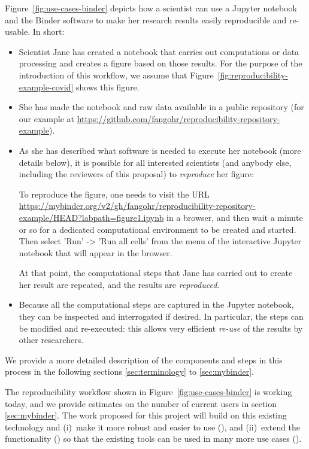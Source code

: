 Figure~\ref{fig:use-cases-binder} depicts how a scientist can use a Jupyter
notebook and the Binder software to make her research results easily
reproducible and re-usable. In short:
\begin{itemize}
\item Scientist Jane has created a notebook that carries out computations or
  data processing and creates a figure based on those results. For the purpose
  of the introduction of this workflow, we assume that
  Figure~\ref{fig:reproducibility-example-covid} shows this figure.

\item She has made the notebook and raw data available in a public repository
  (for our example at\newline
  \mbox{\url{https://github.com/fangohr/reproducibility-repository-example}}).

\item As she has described what software is needed to execute her notebook (more
  details below), it is possible for all interested scientists (and anybody
  else, including the reviewers of this proposal) to \emph{reproduce} her
  figure:

  To reproduce the figure, one needs to visit the URL\newline
  \mbox{\url{https://mybinder.org/v2/gh/fangohr/reproducibility-repository-example/HEAD?labpath=figure1.ipynb}}
  in a browser, and then wait a minute or so for a dedicated computational
  environment to be created and started. Then select 'Run' -> 'Run all cells'
  from the menu of the interactive Jupyter notebook that will appear in the
  browser.

  At that point, the computational steps that Jane has carried out to create her
  result are repeated, and the results are \emph{reproduced}.

\item Because all the computational steps are captured in the Jupyter notebook,
  they can be inspected and interrogated if desired. In particular, the steps
  can be modified and re-executed: this allows very efficient \emph{re-use} of
  the results by other researchers.
\end{itemize}

We provide a more detailed description of the components and steps in this
process in the following sections \ref{sec:terminology} to \ref{sec:mybinder}.

The reproducibility workflow shown in Figure~\ref{fig:use-cases-binder} is
working today, and we provide estimates on the number of current users in
section \ref{sec:mybinder}. The work proposed for this project will build on
this existing technology and (i)~make it more robust and easier to use
(), and (ii)~extend the functionality () so
that the existing tools can be used in many more use cases
().

